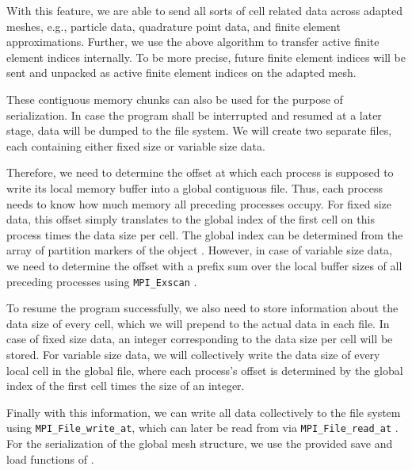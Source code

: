 

With this feature, we are able to send all sorts of cell related data across adapted meshes, e.g., particle data, quadrature point data, and finite element approximations. Further, we use the above algorithm to transfer active finite element indices internally. To be more precise, future finite element indices will be sent and unpacked as active finite element indices on the adapted mesh.

These contiguous memory chunks can also be used for the purpose of serialization. In case the program shall be interrupted and resumed at a later stage, data will be dumped to the file system. We will create two separate files, each containing either fixed size or variable size data.

Therefore, we need to determine the offset at which each process is supposed to write its local memory buffer into a global contiguous file. Thus, each process needs to know how much memory all preceding processes occupy. For fixed size data, this offset simply translates to the global index of the first cell on this process times the data size per cell. The global index can be determined from the array of partition markers of the \pforest{} object \parencite{burstedde2018}. However, in case of variable size data, we need to determine the offset with a prefix sum over the local buffer sizes of all preceding processes using \texttt{MPI\_Exscan} \textcite{mpi31}.

To resume the program successfully, we also need to store information about the data size of every cell, which we will prepend to the actual data in each file. In case of fixed size data, an integer corresponding to the data size per cell will be stored. For variable size data, we will collectively write the data size of every local cell in the global file, where each process's offset is determined by the global index of the first cell times the size of an integer.

Finally with this information, we can write all data collectively to the file system using \texttt{MPI\_File\_write\_at}, which can later be read from via \linebreak \texttt{MPI\_File\_read\_at} \textcite{mpi31}. For the serialization of the global mesh structure, we use the provided save and load functions of \pforest{}.

